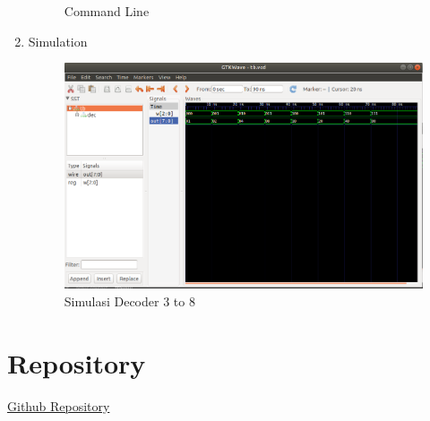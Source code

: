 \documentclass{class}
\begin{document}
\begin{enumerate}
\begin{figure}[H]
        \caption{Command Line}
        \label{decoder24}
        \end{figure}
    \item Simulation
    \begin{figure}[H]
        \centering
        \includegraphics[width=1\linewidth]{gambar/simulation38.png}
        \caption{Simulasi Decoder 3 to 8}
        \label{decoder24}
        \end{figure}
\end{enumerate}
\section{Repository}
\href{https://github.com/afrizaloky/PSD}{Github Repository}
\end{document}
